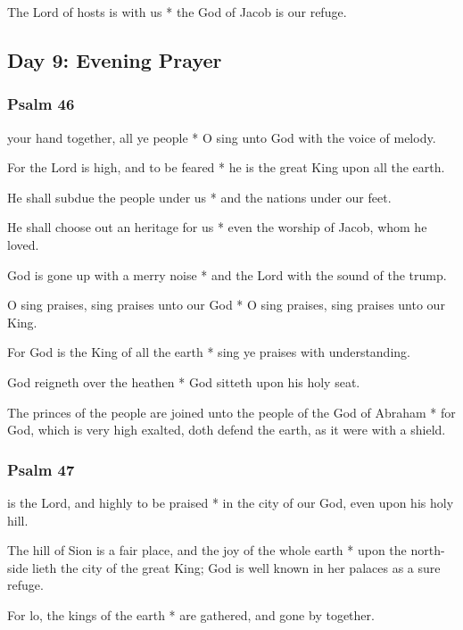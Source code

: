 The Lord of hosts is with us * the God of Jacob is our refuge.

\subsection{Day 9: Evening Prayer}

\subsubsection{Psalm 46}


 your hand together, all ye people * O sing unto God with the voice of melody.

For the Lord is high, and to be feared * he is the great King upon all the earth.

He shall subdue the people under us * and the nations under our feet.

He shall choose out an heritage for us * even the worship of Jacob, whom he loved.

God is gone up with a merry noise * and the Lord with the sound of the trump.

O sing praises, sing praises unto our God * O sing praises, sing praises unto our King.

For God is the King of all the earth * sing ye praises with understanding.

God reigneth over the heathen * God sitteth upon his holy seat.

The princes of the people are joined unto the people of the God of Abraham * for God, which is very high exalted, doth defend the earth, as it were with a shield.

\subsubsection{Psalm 47}


 is the Lord, and highly to be praised * in the city of our God, even upon his holy hill.

The hill of Sion is a fair place, and the joy of the whole earth * upon the north-side lieth the city of the great King; God is well known in her palaces as a sure refuge.

For lo, the kings of the earth * are gathered, and gone by together.


